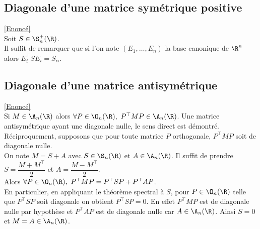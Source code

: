 \documentclass[8pt]{book}
\begin{document}
	\subsection{Diagonale d'une matrice symétrique positive}
	\label{Diagonale d'une matrice symétrique positive corrigé}
	\textcolor{blue}{\hyperref[Diagonale d'une matrice symétrique positive]{[Enoncé]}}\\
	Soit $S\in \S_n^+(\R)$.\\
	Il suffit de remarquer que si l'on note $(E_1,\dots,E_n)$ la base canonique de $\R^n$ alors $E_i^\top SE_i=S_{ii}$.
	
	\subsection{Diagonale d'une matrice antisymétrique}
	\label{Diagonale d'une matrice antisymétrique corrigé}
	\textcolor{blue}{\hyperref[Diagonale d'une matrice antisymétrique]{[Enoncé]}}\\
	Si $M\in \A_n(\R)$ alors $\forall P\in \O_n(\R),\ P^\top MP\in \A_n(\R)$. Une matrice antisymétrique ayant une diagonale nulle, le sens direct est démontré.\\
	Réciproquement, supposons que pour toute matrice $P$ orthogonale, $P^\top MP$ soit de diagonale nulle.\\
	On note $M=S+A$ avec $S\in \S_n(\R)$ et $A\in \A_n(\R)$. Il suffit de prendre $S=\dfrac{M+M^\top}{2}$ et $A=\dfrac{M-M^\top}{2}$.\\
	Alors $\forall P\in \O_n(\R),\ P^\top MP=P^\top SP+P^\top AP$.\\
	En particulier, en appliquant le théorème spectral à $S$, pour $P\in \O_n(\R)$ telle que $P^\top SP$ soit diagonale on obtient $P^\top SP=0$. En effet $P^\top MP$ est de diagonale nulle par hypothèse et $P^\top AP$ est de diagonale nulle car $A\in \A_n(\R)$. Ainsi $S=0$ et $M=A\in \A_n(\R)$.
	
\end{document}
